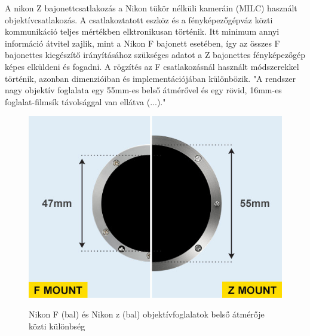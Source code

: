 A nikon Z bajonettcsatlakozás a Nikon tükör nélküli kameráin (MILC) használt objektívcsatlakozás. A csatlakoztatott eszköz és a fényképezőgépváz közti kommunikáció teljes mértékben elktronikusan történik. Itt minimum annyi információ átvitel zajlik, mint a Nikon F bajonett esetében, így az összes F bajonettes kiegészítő irányításához szükséges adatot a Z bajonettes fényképezőgép képes elküldeni és fogadni. A rögzítés az F csatlakozásnál használt módszerekkel történik, azonban dimenzióiban és implementációjában különbözik. "A rendszer nagy objektív foglalata egy 55mm-es belső átmérővel és egy rövid, 16mm-es foglalat-filmsík távolsággal van ellátva (...)."\cite{Nikon_Z}

\begin{figure}[H]
	\centering
	\includegraphics[width=0.5\linewidth]{img/F-mount-vs-Z-mount-illustration.jpg}
    \cite{Nikon_Z}
	\caption{Nikon F (bal) és Nikon z (bal) objektívfoglalatok belső átmérője közti különbség}
	\label{fig:F100_AF_csavar}
\end{figure}